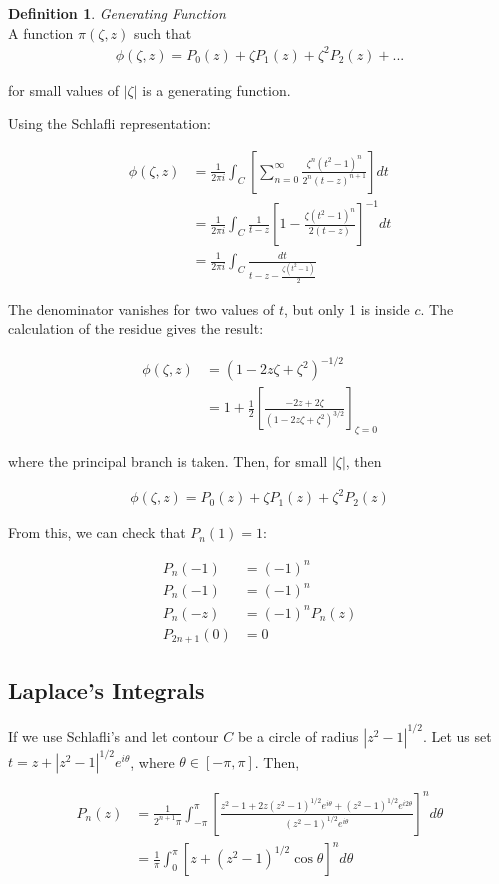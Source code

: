 \documentclass{article}
\theoremstyle{definition}
\newtheorem{definition}{Definition}[section]
\newcommand{\Def}[2]{
\begin{shaded*}
\begin{definition}{\textit{#1}}\\#2\end{definition}
\end{shaded*}
}
\newcommand{\eq}[1]{\begin{align*}
	#1
	\end{align*}}
\begin{document}
\Def{Generating Function}{
A function $\pi(\zeta, z)$ such that 
\eq{\phi(\zeta, z) = P_0(z) + \zeta P_1(z) + \zeta^2 P_2(z) + ...}

for small values of $|\zeta|$ is a generating function.
}
Using the Schlafli representation:

\begin{align*}
\phi(\zeta,z) &= \frac{1}{2 \pi i} \int_C \left[\sum_{n=0}^\infty \frac{\zeta^n(t^2-1)^n}{2^n(t-z)^{n+1}}\right]dt \\ 
&= \frac{1}{2 \pi i} \int_C \frac{1}{t-z}\left[1 -  \frac{\zeta(t^2-1)^n}{2(t-z)}\right]^{-1}dt \\ 
&= \frac{1}{2 \pi i} \int_C \frac{dt}{t-z-\frac{\zeta(t^2-1)}{2}}
\end{align*}


The denominator vanishes for two values of $t$, but only 1 is inside $c$. The calculation of the residue gives the result:

\begin{align*}
\phi(\zeta,z)& = (1-2z \zeta + \zeta^2)^{-1/2} \\ 
&= 1 + \frac{1}{2} \left[\frac{-2z+2\zeta}{(1-2z\zeta + \zeta^2)^{3/2}} \right]_{\zeta=0}
\end{align*}

where the principal branch is taken. Then, for small $|\zeta|$, then 

\begin{align*}
\phi(\zeta,z) = P_0(z) + \zeta P_1(z) + \zeta^2 P_2(z)
\end{align*}

From this, we can check that $P_n(1)=1$:

\begin{align*}
P_n(-1)& = (-1)^n \\ 
P_n(-1) &= (-1)^n \\ 
P_n(-z) &= (-1)^nP_n(z) \\ 
P_{2n+1}(0) &= 0 
\end{align*}

\subsection{Laplace's Integrals}
If we use Schlafli's and let contour $C$ be a circle of radius $|z^2-1|^{1/2}$. Let us set $t=z + |z^2-1|^{1/2} e^{i\theta}$, where $\theta \in [-\pi, \pi]$. Then, 

\begin{align*}
P_n(z) &= \frac{1}{2^{n+1} \pi } \int_{-\pi}^\pi \left[\frac{z^2-1 + 2z(z^2-1)^{1/2} e^{i\theta} + (z^2-1)^{1/2} e^{i2\theta}}{(z^2-1)^{1/2} e^{i\theta}}\right]^n d\theta \\ 
&=\frac{1}{ \pi } \int_{0}^\pi [z +(z^2-1)^{1/2} \cos \theta ]^n d\theta 
\end{align*}
\end{document}
